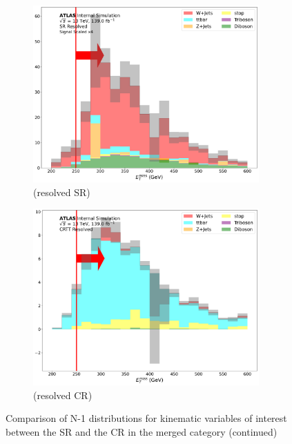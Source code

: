 \begin{figure}[htbp]
    \begin{subfigure}{0.45\textwidth}
     \includegraphics[width = 0.95\textwidth]{Figures/App_SR_CR_distributions/SR1L_Resolved/MetTST_met_N_1.pdf}
    \caption{\met (resolved SR)}
     \end{subfigure}
    \begin{subfigure}{0.45\textwidth}
     \includegraphics[width = 0.95\textwidth]{Figures/App_SR_CR_distributions/CRTT_Resolved/MetTST_met_N_1.pdf}
     \caption{\met (resolved \ttbar CR)}
     \end{subfigure}

     \caption{Comparison of N-1 distributions for kinematic variables of interest between the SR and the \ttbar CR in the merged category (continued)}
     \label{fig:N_1_CRTT_resolved}
  \end{figure}

